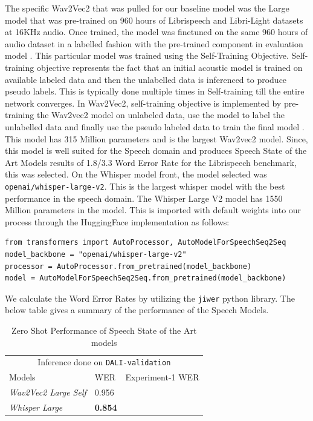The specific Wav2Vec2 that was pulled for our baseline model was the Large model that was pre-trained on 960 hours of Librispeech and Libri-Light datasets at 16KHz audio. Once trained, the model was finetuned on the same 960 hours of audio dataset in a labelled fashion with the pre-trained component in evaluation model . This particular model was trained using the Self-Training Objective. Self-training objective represents the fact that an initial acoustic model is trained on available labeled data and then the unlabelled data is inferenced to produce pseudo labels. This is typically done multiple times in Self-training till the entire network converges. In Wav2Vec2, self-training objective is implemented by pre-training the Wav2vec2 model on unlabeled data, use the model to label the unlabelled data and finally use the pseudo labeled data to train the final model \cite{xu2021self}. This model has 315 Million parameters and is the largest Wav2vec2 model. Since, this model is well suited for the Speech domain and produces Speech State of the Art Models  results of 1.8/3.3 Word Error Rate for the Librispeech benchmark, this was selected. On the Whisper model front, the model selected was \texttt{openai/whisper-large-v2}. This is the largest whisper model with the best performance in the speech domain. The Whisper Large V2 model has 1550 Million parameters in the model. This is imported with default weights into our process through the HuggingFace implementation as follows:

\begin{verbatim}
from transformers import AutoProcessor, AutoModelForSpeechSeq2Seq
model_backbone = "openai/whisper-large-v2"
processor = AutoProcessor.from_pretrained(model_backbone)
model = AutoModelForSpeechSeq2Seq.from_pretrained(model_backbone)
\end{verbatim}

We calculate the Word Error Rates by utilizing the \texttt{jiwer} \cite{morris2004and} python library.  The below table gives a summary of the performance of the Speech Models.


\renewcommand{\arraystretch}{2}
\setlength{\arrayrulewidth}{0.3mm}
\begin{table}[H]
\small
\begin{center}
\begin{tabular}{ |p{7cm}| p{3cm}| p{4cm} | }
\multicolumn{3}{c}{Inference done on \texttt{DALI-validation}} \\
\cline{1-3}
 Models     & WER  & Experiment-1 WER \\
\hline  \hline
 \textit{Wav2Vec2 Large Self}               &                 0.956  &   \\
 \textit{Whisper Large}                     &         \textbf{0.854} & \\
\hline  \hline
\end{tabular}
\caption{\label{zeroshot} Zero Shot Performance of Speech State of the Art  models}
\end{center}
\end{table}


